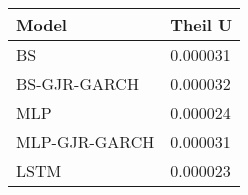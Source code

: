 \begin{tabular}{ll}
\toprule
Model & Theil U \\
\midrule
BS & 0.000031 \\
BS-GJR-GARCH & 0.000032 \\
MLP & 0.000024 \\
MLP-GJR-GARCH & 0.000031 \\
LSTM & 0.000023 \\
\bottomrule
\end{tabular}
